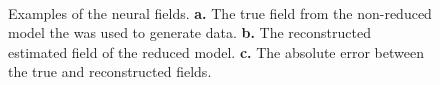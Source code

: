\documentclass[twocolumn,11pt,a4paper]{article}		%
\begin{document}
\begin{figure}[!th]
\centering 
{}
\\
\caption{Examples of the neural fields. \textbf{a.} The true field from the non-reduced model the was used to generate data. \textbf{b.} The reconstructed estimated field of the reduced model. \textbf{c.} The absolute error between the true and reconstructed fields.}
\label{fig:FieldEstimate}
\end{figure}
\end{document}
